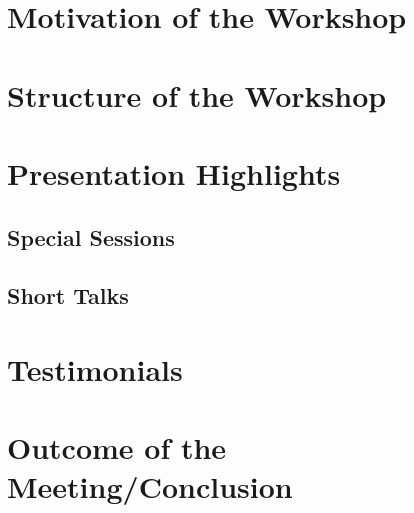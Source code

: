 \section{Motivation of the Workshop}



\section{Structure of the Workshop}



\section{Presentation Highlights}

\subsection{Special Sessions}





\subsection{Short Talks}













\section{Testimonials}






\section{Outcome of the Meeting/Conclusion}

